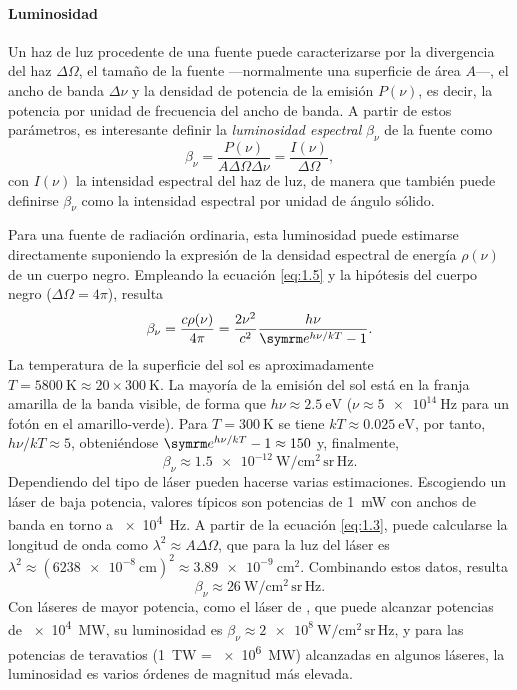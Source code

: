 \paragraph{Luminosidad}\label{par:1.1.2.4}
Un haz de luz procedente de una fuente puede caracterizarse por la divergencia del haz $\Delta\Omega$, el tamaño de la fuente 
---normalmente una superficie de área $A$---, el ancho de banda $\Delta\nu$ y la densidad de potencia de la emisión $P(\nu)$, es decir, la potencia por unidad de frecuencia del ancho de banda\autocite{Milonni1988Lasers}. A partir de estos parámetros, es interesante definir la \emph{luminosidad espectral} $\beta_{\nu}$ de la fuente como 
\begin{equation}\label{eq:1.5}
    \beta_{\nu} = \frac{P(\nu)}{A\Delta\Omega\Delta\nu} = \frac{I(\nu)}{\Delta\Omega},
\end{equation}
con $I(\nu)$ la intensidad espectral del haz de luz, de manera que también puede definirse $\beta_{\nu}$ como la intensidad espectral por unidad de ángulo sólido.

Para una fuente de radiación ordinaria, esta luminosidad puede estimarse directamente suponiendo la expresión de la densidad espectral de energía $\rho(\nu)$ de un cuerpo negro. Empleando la ecuación \eqref{eq:1.5} y la hipótesis del cuerpo negro ($\Delta\Omega=4\pi$), resulta
\begin{equation}\label{eq:1.6}
    \beta_{\nu} = \frac{c\rho(\nu)}{4\pi} = \frac{2\nu^2}{c^2}\dfrac{h\nu}{\eu^{h\nu/kT}-1}.
\end{equation}
La temperatura de la superficie del sol es aproximadamente $T = \qty{5800}{\K} \approx 20 \times \qty{300}{\K}$. La mayoría de la emisión del sol está en la franja amarilla de la banda visible, de forma que $h\nu \approx \qty{2,5}{\eV}$ ($\nu \approx \qty{5e14}{\Hz}$ para un fotón en el amarillo-verde). Para $T = \qty{300}{\K}$ se tiene $kT \approx \qty{0,025}{\eV}$, por tanto, $h\nu/kT \approx 5$, obteniéndose $\eu^{h\nu/kT}-1 \approx 150$ y, finalmente,
\begin{equation}\label{eq:1.7}
    \beta_{\nu} \approx \qty{1,5e-12}{\W\per\cm^2\,\steradian\,\Hz}.
\end{equation}
Dependiendo del tipo de láser pueden hacerse varias estimaciones. Escogiendo un láser  de baja potencia, valores típicos\autocite{Milonni1988Lasers} son potencias de \qty{1}{\mW} con anchos de banda en torno a \qty{e4}{\Hz}. A partir de la ecuación \eqref{eq:1.3}, puede calcularse la longitud de onda como $\lambda^2 \approx A\Delta\Omega$, que para la luz del láser  es $\lambda^2 \approx (\qty{6238e-8}{\cm})^2 \approx \qty{3,89e-9}{\cm^2}$. Combinando estos datos, resulta 
\begin{equation}\label{eq:1.8}
    \beta_{\nu} \approx \qty{26}{\W\per\cm^2\,\steradian\,\Hz}.
\end{equation}
Con láseres de mayor potencia, como el láser de , que puede alcanzar potencias de \qty{e4}{\MW}, su luminosidad es $\beta_{\nu} \approx \qty{2e8}{\W\per\cm^2\,\steradian\,\Hz}$, y para las potencias de teravatios (\qty{1}{\tera\W} = \qty{e6}{\MW}) alcanzadas en algunos láseres, la luminosidad es varios órdenes de magnitud más elevada.


